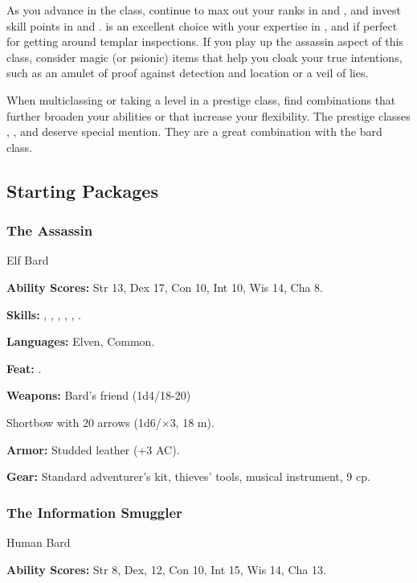 As you advance in the class, continue to max out your ranks in  and , and invest skill points in  and .  is an excellent choice with your expertise in , and  if perfect for getting around templar inspections. If you play up the assassin aspect of this class, consider magic (or psionic) items that help you cloak your true intentions, such as an amulet of proof against detection and location or a veil of lies.

When multiclassing or taking a level in a prestige class, find combinations that further broaden your abilities or that increase your flexibility. The prestige classes , , and  deserve special mention. They are a great combination with the bard class.

\subsection{Starting Packages}
\subsubsection{The Assassin}
Elf Bard

\textbf{Ability Scores:} Str 13, Dex 17, Con 10, Int 10, Wis 14, Cha 8.

\textbf{Skills:} , , , , , .

\textbf{Languages:} Elven, Common.

\textbf{Feat:} .

\textbf{Weapons:} Bard's friend (1d4/18-20)

Shortbow with 20 arrows (1d6/$\times$3, 18 m).

\textbf{Armor:} Studded leather (+3 AC).

\textbf{Gear:} Standard adventurer's kit, thieves' tools, musical instrument, 9 cp.

\subsubsection{The Information Smuggler}
Human Bard

\textbf{Ability Scores:} Str 8, Dex, 12, Con 10, Int 15, Wis 14, Cha 13.


